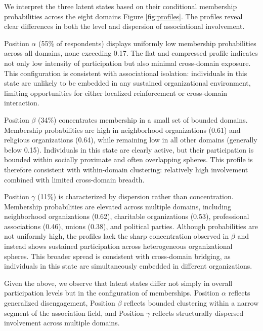 We interpret the three latent states based on their conditional membership probabilities across the eight domains Figure \ref{fig:profiles}. The profiles reveal clear differences in both the level and dispersion of associational involvement.

Position $\alpha$ (55\% of respondents) displays uniformly low membership probabilities across all domains, none exceeding 0.17. The flat and compressed profile indicates not only low intensity of participation but also minimal cross-domain exposure. This configuration is consistent with associational isolation: individuals in this state are unlikely to be embedded in any sustained organizational environment, limiting opportunities for either localized reinforcement or cross-domain interaction.

Position $\beta$ (34\%) concentrates membership in a small set of bounded domains. Membership probabilities are high in neighborhood organizations (0.61) and religious organizations (0.64), while remaining low in all other domains (generally below 0.15). Individuals in this state are clearly active, but their participation is bounded within socially proximate and often overlapping spheres. This profile is therefore consistent with within-domain clustering: relatively high involvement combined with limited cross-domain breadth.

Position $\gamma$ (11\%) is characterized by dispersion rather than concentration. Membership probabilities are elevated across multiple domains, including neighborhood organizations (0.62), charitable organizations (0.53), professional associations (0.46), unions (0.38), and political parties. Although probabilities are not uniformly high, the profiles lack the sharp concentration observed in $\beta$ and instead shows sustained participation across heterogeneous organizational spheres. This broader spread is consistent with cross-domain bridging, as individuals in this state are simultaneously embedded in different organizations.

Given the above, we observe that latent states differ not simply in overall participation levels but in the configuration of memberships. Position $\alpha$ reflects generalized disengagement, Position $\beta$ reflects bounded clustering within a narrow segment of the association field, and Position $\gamma$ reflects structurally dispersed involvement across multiple domains.



